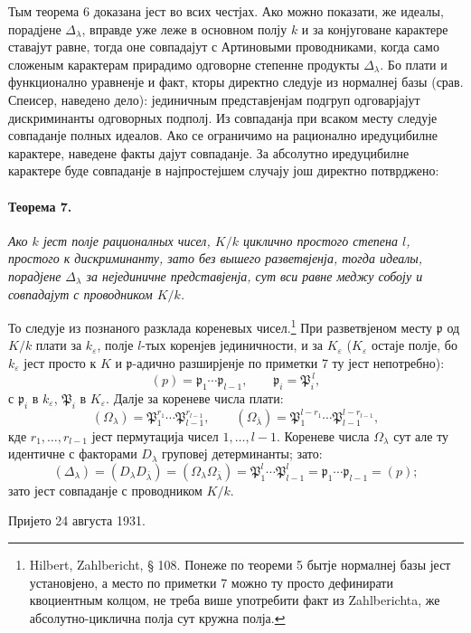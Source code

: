 \documentclass[11pt]{article}
\providecommand{\frakp}{\mathfrak{p}}
\begin{document}
Тым теорема 6 доказана јест во всих честјах. Ако можно показати, же идеалы, порадјене \(\Delta_\lambda\), вправде уже леже в основном полју \(k\) и за конјуговане карактере ставајут равне, тогда оне совпадајут с Артиновыми проводниками, когда само сложеным карактерам прирадимо одговорне степенне продукты \(\Delta_\lambda\). Бо плати и функционално уравненје и факт, кторы директно следује из нормалнеј базы (срав. Спеисер, наведено дело): јединичным представјенјам подгруп одговарјајут дискриминанты одговорных подполј. Из совпаданја при всаком месту следује совпаданје полных идеалов. Ако се ограничимо на рационално иредуцибилне карактере, наведене факты дајут совпаданје. За абсолутно иредуцибилне карактере буде совпаданје в најпростејшем случају још директно потврджено:

\paragraph{Теорема 7.}
\emph{Ако \(k\) јест полје рационалных чисел, \(K/k\) циклично простого степена \(l\), простого к дискриминанту, зато без вышего разветвјенја, тогда идеалы, порадјене \(\Delta_\lambda\) за нејединичне представјенја, сут вси равне меджу собоју и совпадајут с проводником \(K/k\).}

То следује из познаного разклада кореневых чисел.\footnote{Hilbert, Zahlbericht, § 108. Понеже по теореми 5 бытје нормалнеј базы јест установјено, а место по приметки 7 можно ту просто дефинирати квоциентным колцом, не треба више употребити факт из Zahlberichta, же абсолутно-циклична полја сут кружна полја.} При разветвјеном месту \(\frakp\) од \(K/k\) плати за \(k_\varepsilon\), полје \(l\)-тых коренјев јединичности, и за \(K_\varepsilon\) (\(K_\varepsilon\) остаје полје, бо \(k_\varepsilon\) јест просто к \(K\) и \(\frakp\)-адично разширјенје по приметки 7 ту јест непотребно):
\[
        (p)=\frakp_1\cdots\frakp_{l-1},
        \qquad
        \frakp_i=\mathfrak P_i^{\,l},
\]
с \(\frakp_i\) в \(k_\varepsilon\), \(\mathfrak P_i\) в \(K_\varepsilon\). Далје за кореневе числа плати:
\[
        (\Omega_\lambda)=\mathfrak P_1^{r_1}\cdots\mathfrak P_{l-1}^{r_{l-1}},
        \qquad
        (\Omega_{\bar\lambda})=
        \mathfrak P_1^{l-r_1}\cdots \mathfrak P_{l-1}^{l-r_{l-1}},
\]
кде \(r_1,\ldots,r_{l-1}\) јест пермутација чисел \(1,\ldots,l-1\). Кореневе числа \(\Omega_\lambda\) сут але ту идентичне с факторами \(D_\lambda\) груповеј детерминанты; зато:
\[
        (\Delta_\lambda)=(D_\lambda D_{\bar\lambda})
        =(\Omega_\lambda\Omega_{\bar\lambda})
        =\mathfrak P_1^{l}\cdots\mathfrak P_{l-1}^{l}
        =\frakp_1\cdots\frakp_{l-1}=(p);
\]
зато јест совпаданје с проводником \(K/k\).

\begin{center}
Пријето 24 августа 1931.
\end{center}
\end{document}
